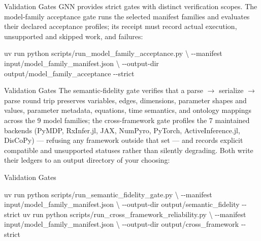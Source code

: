 \documentclass[
  ignorenonframetext,
]{beamer}
\newenvironment{Shaded}{}{}
\newcommand{\AttributeTok}[1]{\textcolor[rgb]{0.49,0.56,0.16}{#1}}
\newcommand{\DataTypeTok}[1]{\textcolor[rgb]{0.56,0.13,0.00}{#1}}
\newcommand{\ExtensionTok}[1]{#1}
\newcommand{\NormalTok}[1]{#1}
\begin{document}
\begin{frame}{Validation Gates}
\protect{}\label{validation-gates}
GNN provides strict gates with distinct verification scopes. The
model-family acceptance gate runs the selected manifest families and
evaluates their declared acceptance profiles; its receipt must record
actual execution, unsupported and skipped work, and failures:

\begin{Shaded}
\begin{Highlighting}[]
\ExtensionTok{uv}\NormalTok{ run python scripts/run\_model\_family\_acceptance.py }\DataTypeTok{\textbackslash{}}
  \AttributeTok{{-}{-}manifest}\NormalTok{ input/model\_family\_manifest.json }\DataTypeTok{\textbackslash{}}
  \AttributeTok{{-}{-}output{-}dir}\NormalTok{ output/model\_family\_acceptance }\AttributeTok{{-}{-}strict}
\end{Highlighting}
\end{Shaded}

\end{frame}

\begin{frame}{Validation Gates}
The semantic-fidelity gate verifies that a parse \texorpdfstring{\ensuremath{\to}}{->} serialize \texorpdfstring{\ensuremath{\to}}{->} parse
round trip preserves variables, edges, dimensions, parameter shapes and
values, parameter metadata, equations, time semantics, and ontology
mappings across the 9 model families; the cross-framework gate profiles
the 7 maintained backends (PyMDP, RxInfer.jl, JAX, NumPyro, PyTorch,
ActiveInference.jl, DisCoPy) --- refusing any framework outside that set
--- and records explicit compatible and unsupported statuses rather than
silently degrading. Both write their ledgers to an output directory of
your choosing:

\end{frame}

\begin{frame}{Validation Gates}
\begin{Shaded}
\begin{Highlighting}[]
\ExtensionTok{uv}\NormalTok{ run python scripts/run\_semantic\_fidelity\_gate.py }\DataTypeTok{\textbackslash{}}
  \AttributeTok{{-}{-}manifest}\NormalTok{ input/model\_family\_manifest.json }\DataTypeTok{\textbackslash{}}
  \AttributeTok{{-}{-}output{-}dir}\NormalTok{ output/semantic\_fidelity }\AttributeTok{{-}{-}strict}
\ExtensionTok{uv}\NormalTok{ run python scripts/run\_cross\_framework\_reliability.py }\DataTypeTok{\textbackslash{}}
  \AttributeTok{{-}{-}manifest}\NormalTok{ input/model\_family\_manifest.json }\DataTypeTok{\textbackslash{}}
  \AttributeTok{{-}{-}output{-}dir}\NormalTok{ output/cross\_framework }\AttributeTok{{-}{-}strict}
\end{Highlighting}
\end{Shaded}

\end{frame}
\end{document}
